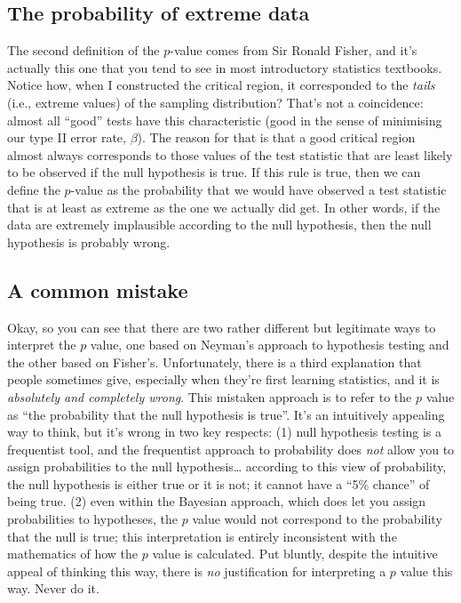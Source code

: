 \documentclass[
]{book}
\begin{document}
\hypertarget{the-probability-of-extreme-data}{%
\subsection{The probability of extreme data}\label{the-probability-of-extreme-data}}

The second definition of the \(p\)-value comes from Sir Ronald Fisher, and it's actually this one that you tend to see in most introductory statistics textbooks. Notice how, when I constructed the critical region, it corresponded to the \emph{tails} (i.e., extreme values) of the sampling distribution? That's not a coincidence: almost all ``good'' tests have this characteristic (good in the sense of minimising our type II error rate, \(\beta\)). The reason for that is that a good critical region almost always corresponds to those values of the test statistic that are least likely to be observed if the null hypothesis is true. If this rule is true, then we can define the \(p\)-value as the probability that we would have observed a test statistic that is at least as extreme as the one we actually did get. In other words, if the data are extremely implausible according to the null hypothesis, then the null hypothesis is probably wrong.

\hypertarget{a-common-mistake}{%
\subsection{A common mistake}\label{a-common-mistake}}

Okay, so you can see that there are two rather different but legitimate ways to interpret the \(p\) value, one based on Neyman's approach to hypothesis testing and the other based on Fisher's. Unfortunately, there is a third explanation that people sometimes give, especially when they're first learning statistics, and it is \emph{absolutely and completely wrong}. This mistaken approach is to refer to the \(p\) value as ``the probability that the null hypothesis is true''. It's an intuitively appealing way to think, but it's wrong in two key respects: (1) null hypothesis testing is a frequentist tool, and the frequentist approach to probability does \emph{not} allow you to assign probabilities to the null hypothesis\ldots{} according to this view of probability, the null hypothesis is either true or it is not; it cannot have a ``5\% chance'' of being true. (2) even within the Bayesian approach, which does let you assign probabilities to hypotheses, the \(p\) value would not correspond to the probability that the null is true; this interpretation is entirely inconsistent with the mathematics of how the \(p\) value is calculated. Put bluntly, despite the intuitive appeal of thinking this way, there is \emph{no} justification for interpreting a \(p\) value this way. Never do it.
\end{document}
